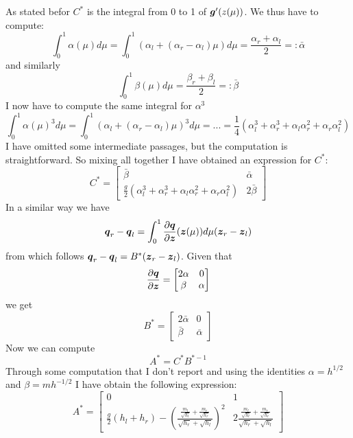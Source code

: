 \documentclass[oneside,12pt]{book}  %
\theoremstyle{plain}
\theoremstyle{definition}
\theoremstyle{remark}
\numberwithin{equation}{chapter} %
\begin{document}
As stated befor $C^*$ is the integral from 0 to 1 of
$\gg'(\\z(\mu))$. We thus have to compute:
\begin{equation}
  \label{eq:alpha_integral}
  \int_0^1\alpha(\mu)d\mu=\int_0^1(\alpha_l+(\alpha_r-\alpha_l)\mu)d\mu=\frac{\alpha_r+\alpha_l}{2}=:\bar{\alpha}
\end{equation}
and similarly
\begin{equation}
  \label{eq:beta_integral}
  \int_0^1\beta(\mu)d\mu=\frac{\beta_r+\beta_l}{2}=:\bar{\beta}
\end{equation}
I now have to compute the same integral for $\alpha^3$
\begin{equation}
  \label{eq:alpha_cubic_integral}
  \int_0^1\alpha(\mu)^3d\mu=\int_0^1(\alpha_l+(\alpha_r-\alpha_l)\mu)^3d\mu=...=
  \frac{1}{4}(\alpha_l^3+\alpha_r^3+\alpha_l\alpha_r^2+\alpha_r\alpha_l^2)
\end{equation}
I have omitted some intermediate passages, but the computation is
straightforward. So mixing all together I have obtained an expression
for $C^*$:
\begin{equation}
  \label{eq:c_matrix}
  C^*=\begin{bmatrix} \bar{\beta} & \bar{\alpha} \\ \frac{g}{2} (\alpha_l^3+\alpha_r^3+\alpha_l\alpha_r^2+\alpha_r\alpha_l^2)
  & 2\bar{\beta} \end{bmatrix}
\end{equation}
\newline
In a similar way we have $$\qq_r-\qq_l=\int_0^1\frac{\partial
  \qq}{\partial \zz}(\zz(\mu))d\mu(\zz_r-\zz_l)$$
from which follows $\qq_r-\qq_l=B^*(\zz_r-\zz_l)$. Given
that $$\frac{\partial \qq}{\partial \zz}=\begin{bmatrix} 2\alpha & 0\\
  \beta & \alpha \end{bmatrix}$$ we get
\begin{equation}
  \label{eq:b_matrix}
  B^*=\begin{bmatrix} 2\bar\alpha & 0\\
  \bar\beta & \bar\alpha \end{bmatrix}
\end{equation}
Now we can compute $$A^*=C^*B^{*-1}$$ Through some computation that I
don't report and using the identities $\alpha=h^{1/2}$ and
$\beta=mh^{-1/2}$ I have obtain the following expression:
\begin{equation}
 \label{eq:a_matrix}
  A^*=\begin{bmatrix} 0 & 1\\
  \frac{g}{2}(h_l+h_r)- \left
    (\frac{\frac{m_l}{\sqrt{h_l}}+\frac{m_r}{\sqrt{h_r}}
    }{\sqrt{h_r}+\sqrt{h_l}} \right )^2& 
  2\frac{\frac{m_l}{\sqrt{h_l}}+\frac{m_r}{\sqrt{h_r}} }{\sqrt{h_r}+\sqrt{h_l}} \end{bmatrix}
\end{equation}
\end{document}
